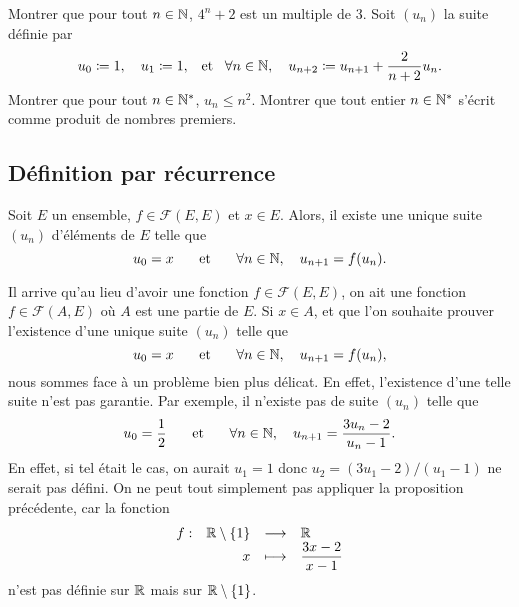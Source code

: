 \documentclass{magnoliaold}
\begin{document}
\begin{exos}
\exo Montrer que pour tout $n\in\mathbb{N}$, $4^n+2$ est un multiple de 3.
\exo Soit $(u_n)$ la suite définie par
  \[u_0\coloneqq 1,\quad u_1\coloneqq 1, \quad\!\text{et}\quad\! \forall n\in\mathbb{N},\quad u_{n+2}\coloneqq u_{n+1}+\frac{2}{n+2}u_n.\]
  Montrer que pour tout $n\in{\mathbb{N}^*}$, $u_n\leq n^2$.
\exo
  Montrer que tout entier $n\in{\mathbb{N}^*}$ s'écrit comme produit
  de nombres premiers.
\end{exos}



\subsection{Définition par récurrence}

\begin{proposition}
Soit $E$ un ensemble, $f\in\mathcal{F}(E,E)$  et $x\in E$. Alors, il existe une unique
suite $(u_n)$ d'éléments de $E$ telle que
\[u_0=x \quad\quad\!\text{et}\quad\!\quad \forall n\in\mathbb{N},\quad u_{n+1}=f(u_n).\]
\end{proposition}

\begin{remarqueUnique}
\remarque Il arrive qu'au lieu d'avoir une fonction $f\in\mathcal{F}(E,E)$,
  on ait une fonction $f\in\mathcal{F}(A, E)$ où $A$ est une partie de $E$. Si $x\in A$,
  et que l'on souhaite prouver l'existence d'une unique suite $(u_n)$ telle que
  \[u_0=x \quad\quad\!\text{et}\quad\!\quad \forall n\in\mathbb{N},\quad u_{n+1}=f(u_n),\]
  nous sommes face à un problème bien plus délicat. En effet, l'existence d'une
  telle suite n'est pas garantie. 
  Par exemple, il n'existe pas de suite $(u_n)$ telle que
  \[u_0=\frac{1}{2} \quad\quad\!\text{et}\quad\!\quad \forall n\in\mathbb{N},\quad u_{n+1}=\frac{3 u_n-2}{u_n-1}.\]
  En effet, si tel était le cas,
  on aurait $u_1=1$ donc $u_2=(3u_1-2)/(u_1-1)$ ne serait pas défini. On ne peut tout
  simplement pas appliquer la proposition précédente, car la fonction
  \[\begin{array}[t]{lrcl} \displaystyle{f} : & \displaystyle{\mathbb{R}\setminus\left\{1\right\}} & \longrightarrow & \displaystyle{\mathbb{R}} \\ & \displaystyle{x} & \longmapsto & \displaystyle{\frac{3x-2}{x-1}} \end{array}\]
  n'est pas définie sur $\mathbb{R}$ mais sur $\mathbb{R}\setminus\left\{1\right\}$.
\end{remarqueUnique} 
\end{document}
